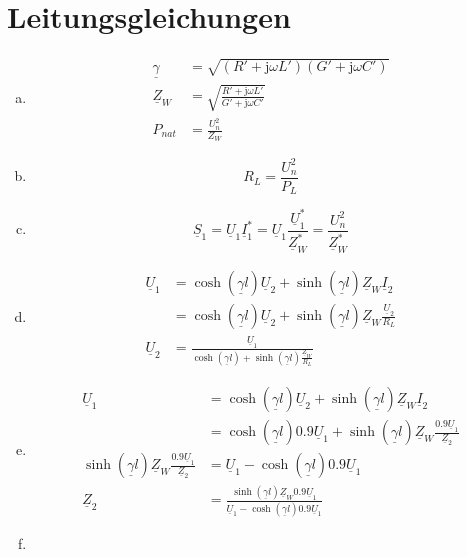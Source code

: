 ﻿\documentclass[11pt,a4paper]{scrartcl}
\newcommand{\mybr}[1]{\left(#1\right)}
\newcommand{\ugamma}{\underline{\gamma}}
\renewcommand{\j}{\mathrm{j}}
\newcommand{\Z}{\underline{Z}}
\renewcommand{\S}{\underline{S}}
\newcommand{\U}{\underline{U}}
\newcommand{\I}{\underline{I}}
\newcommand{\0}{_{\mybr{0}}}
\newcommand{\1}{_{\mybr{1}}}
\newcommand{\2}{_{\mybr{2}}}
\begin{document}
\section{Leitungsgleichungen}
\begin{enumerate}[a)]
\item
\begin{align}
\ugamma&=\sqrt{\mybr{R'+\j\omega L'}\mybr{G'+\j\omega C'}}\\
\Z_W&=\sqrt{\frac{R'+\j\omega L'}{G'+\j\omega C'}}\\
P_{nat}&=\frac{U_n^2}{Z_W}
\end{align}
\item
\begin{equation}
R_L=\frac{U_n^2}{P_L}
\end{equation}
\item
\begin{equation}
\S_1=\U_1\I_1^*=\U_1\frac{\U_1^*}{\Z_W^*}=\frac{U_n^2}{\Z_W^*}
\end{equation}
\item
\begin{align}
\U_1&=\cosh\mybr{\ugamma l}\U_2+\sinh\mybr{\ugamma l}\Z_W\I_2\\
&=\cosh\mybr{\ugamma l}\U_2+\sinh\mybr{\ugamma l}\Z_W\frac{\U_2}{R_L}\\
\U_2&=\frac{\U_1}{\cosh\mybr{\ugamma l}+\sinh\mybr{\ugamma l}\frac{\Z_W}{R_L}}
\end{align}
\item
\begin{align}
\U_1&=\cosh\mybr{\ugamma l}\U_2+\sinh\mybr{\ugamma l}\Z_W\I_2\\
&=\cosh\mybr{\ugamma l}\SI{0,9}\U_1+\sinh\mybr{\ugamma l}\Z_W\frac{\SI{0,9}\U_1}{\Z_2}\\
\sinh\mybr{\ugamma l}\Z_W\frac{\SI{0,9}\U_1}{\Z_2}&=\U_1-\cosh\mybr{\ugamma l}\SI{0,9}\U_1\\
\Z_2&=\frac{\sinh\mybr{\ugamma l}\Z_W\SI{0,9}\U_1}{\U_1-\cosh\mybr{\ugamma l}\SI{0,9}\U_1}
\end{align}
\item
\end{enumerate}
\end{document}
